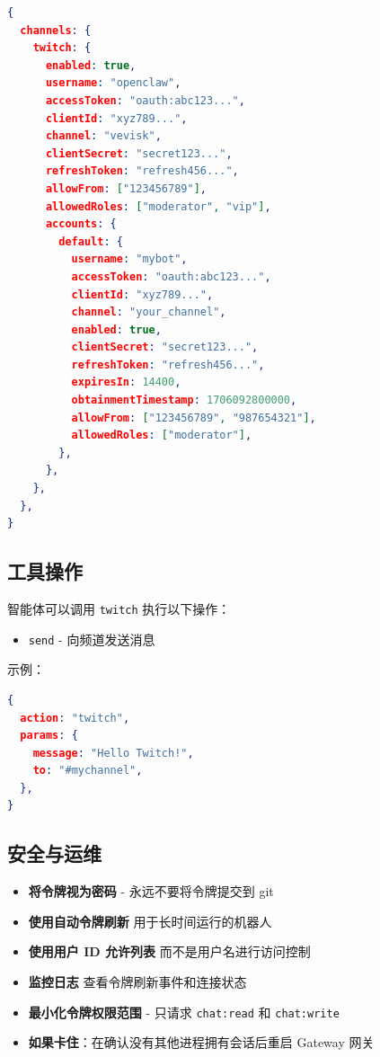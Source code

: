 \begin{lstlisting}[language=json]
{
  channels: {
    twitch: {
      enabled: true,
      username: "openclaw",
      accessToken: "oauth:abc123...",
      clientId: "xyz789...",
      channel: "vevisk",
      clientSecret: "secret123...",
      refreshToken: "refresh456...",
      allowFrom: ["123456789"],
      allowedRoles: ["moderator", "vip"],
      accounts: {
        default: {
          username: "mybot",
          accessToken: "oauth:abc123...",
          clientId: "xyz789...",
          channel: "your_channel",
          enabled: true,
          clientSecret: "secret123...",
          refreshToken: "refresh456...",
          expiresIn: 14400,
          obtainmentTimestamp: 1706092800000,
          allowFrom: ["123456789", "987654321"],
          allowedRoles: ["moderator"],
        },
      },
    },
  },
}
\end{lstlisting}


\subsection{工具操作}


智能体可以调用 \texttt{twitch} 执行以下操作：

\begin{itemize}
  \item \texttt{send} - 向频道发送消息
\end{itemize}


示例：

\begin{lstlisting}[language=json]
{
  action: "twitch",
  params: {
    message: "Hello Twitch!",
    to: "#mychannel",
  },
}
\end{lstlisting}


\subsection{安全与运维}


\begin{itemize}
  \item \textbf{将令牌视为密码} - 永远不要将令牌提交到 git
  \item \textbf{使用自动令牌刷新} 用于长时间运行的机器人
  \item \textbf{使用用户 ID 允许列表} 而不是用户名进行访问控制
  \item \textbf{监控日志} 查看令牌刷新事件和连接状态
  \item \textbf{最小化令牌权限范围} - 只请求 \texttt{chat:read} 和 \texttt{chat:write}
  \item \textbf{如果卡住}：在确认没有其他进程拥有会话后重启 Gateway 网关
\end{itemize}



